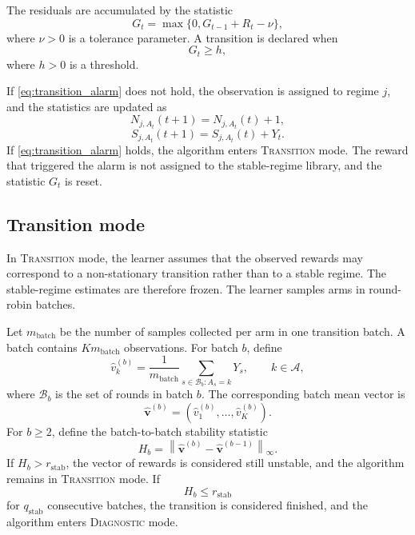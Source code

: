 \documentclass[11pt]{article}
\newcommand{\A}{\mathcal A}
\newcommand{\norm}[1]{\left\lVert #1 \right\rVert}
\begin{document}
The residuals are accumulated by the statistic
\begin{equation}
\label{eq:cusum_statistic}
G_t
=
\max\{0,G_{t-1}+R_t-\nu\},
\end{equation}
where $\nu>0$ is a tolerance parameter. A transition is declared when
\begin{equation}
\label{eq:transition_alarm}
G_t\geq h,
\end{equation}
where $h>0$ is a threshold.

If \eqref{eq:transition_alarm} does not hold, the observation is assigned to regime $j$, and the statistics are updated as
\begin{equation}
\label{eq:update_count_stable}
N_{j,A_t}(t+1)=N_{j,A_t}(t)+1,
\end{equation}
\begin{equation}
\label{eq:update_sum_stable}
S_{j,A_t}(t+1)=S_{j,A_t}(t)+Y_t.
\end{equation}
If \eqref{eq:transition_alarm} holds, the algorithm enters \textsc{Transition} mode. The reward that triggered the alarm is not assigned to the stable-regime library, and the statistic $G_t$ is reset.

\subsection{Transition mode}
\label{subsec:transition_mode}

In \textsc{Transition} mode, the learner assumes that the observed rewards may correspond to a non-stationary transition rather than to a stable regime. The stable-regime estimates are therefore frozen. The learner samples arms in round-robin batches.

Let $m_{\mathrm{batch}}$ be the number of samples collected per arm in one transition batch. A batch contains $K m_{\mathrm{batch}}$ observations. For batch $b$, define
\begin{equation}
\label{eq:batch_mean_arm}
\widehat v_k^{(b)}
=
\frac{1}{m_{\mathrm{batch}}}
\sum_{s\in\mathcal B_b: A_s=k}Y_s,
\qquad
k\in\A,
\end{equation}
where $\mathcal B_b$ is the set of rounds in batch $b$. The corresponding batch mean vector is
\begin{equation}
\label{eq:batch_mean_vector}
\widehat{\bm v}^{(b)}
=
(\widehat v_1^{(b)},\ldots,\widehat v_K^{(b)}).
\end{equation}
For $b\geq 2$, define the batch-to-batch stability statistic
\begin{equation}
\label{eq:stability_statistic}
H_b
=
\norm{\widehat{\bm v}^{(b)}-\widehat{\bm v}^{(b-1)}}_{\infty}.
\end{equation}
If $H_b>r_{\mathrm{stab}}$, the vector of rewards is considered still unstable, and the algorithm remains in \textsc{Transition} mode. If
\begin{equation}
\label{eq:transition_stability_condition}
H_b\leq r_{\mathrm{stab}}
\end{equation}
for $q_{\mathrm{stab}}$ consecutive batches, the transition is considered finished, and the algorithm enters \textsc{Diagnostic} mode.
\end{document}
